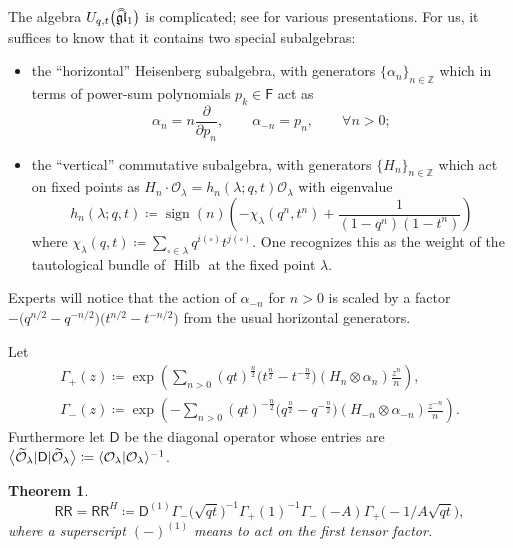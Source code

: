 \documentclass[pdftex]{sigma}%
\numberwithin{equation}{section}
\newtheorem{Theorem}{Theorem}[section]
\renewcommand{\hat}[1]{\widehat{#1}}
\newcommand{\hhat}[1]{\hat{\vphantom{\rule{1pt}{5.5pt}}\smash{\hat{#1}}}}
\renewcommand{\tilde}[1]{\widetilde{#1}}
\newcommand{\lie}[1]{\mathfrak{#1}}
\newcommand{\bZ}{\mathbb{Z}}
\newcommand{\cO}{\mathcal{O}}
\newcommand{\sD}{\mathsf{D}}
\newcommand{\sF}{\mathsf{F}}
\newcommand{\sRR}{\mathsf{RR}}
\newcommand{\di}{\partial}
\DeclareMathOperator{\sign}{sign}
\DeclareMathOperator{\Hilb}{Hilb}
\DeclarePairedDelimiter{\inner}{\langle}{\rangle}
\begin{document}
\begin{MyParagraph}\label{sec:quantum-toroidal-gl1-details}
The algebra $U_{q,t}\big(\hhat{\lie{gl}}_1\big)$ is complicated; see
\cite{Schiffmann2012} for various presentations. For us, it suffices
to know that it contains two special subalgebras:
\begin{itemize}\itemsep=0pt
\item the ``horizontal'' Heisenberg subalgebra, with generators
 $\{\alpha_n\}_{n \in \bZ}$ which in terms of power-sum polynomials
 $p_k \in \sF$ act as
 \[ \alpha_n = n\frac{\di}{\di p_n}, \qquad \alpha_{-n} = p_n, \qquad \forall n > 0; \]
\item the ``vertical'' commutative subalgebra, with generators
 $\{H_n\}_{n \in \bZ}$ which act on fixed points as $H_n \cdot \cO_\lambda
 = h_n(\lambda;q,t) \cO_\lambda$ with eigenvalue
 \begin{equation} \label{eq:tautological-weight-hilb}
 h_n(\lambda;q,t) \coloneqq \sign(n) \left(-\chi_\lambda(q^n, t^n) + \frac{1}{(1 - q^n)(1 - t^n)}\right)
 \end{equation}
 where
 $\chi_{\lambda}(q,t) \coloneqq \sum_{\square \in \lambda} q^{i(\square)} t^{j(\square)}$.
 One recognizes this as the weight of the tautological bundle of
 $\Hilb$ at the fixed point $\lambda$.
\end{itemize}
Experts will notice that the action of $\alpha_{-n}$ for $n > 0$ is
scaled by a factor $-\big(q^{n/2}-q^{-n/2}\big)\big(t^{n/2}-t^{-n/2}\big)$ from the
usual horizontal generators.
\end{MyParagraph}

\begin{MyParagraph}
Let
\begin{gather}
 \Gamma_+(z) \coloneqq \exp\left(\sum_{n>0} (qt)^{\frac{n}{2}} \big(t^{\frac{n}{2}} - t^{-\frac{n}{2}}\big) (H_n \otimes \alpha_n) \frac{z^n}{n}\right),\nonumber \\
 \Gamma_-(z) \coloneqq \exp\left(-\sum_{n>0} (qt)^{-\frac{n}{2}} \big(q^{\frac{n}{2}} - q^{-\frac{n}{2}}\big) (H_{-n} \otimes \alpha_{-n}) \frac{z^{-n}}{n}\right).\label{eq:gamma-vertex-operators}
 \end{gather}
Furthermore let $\sD$ be the diagonal operator whose entries are
$\big\langle \tilde\cO_\lambda | \sD | \tilde\cO_\lambda\big\rangle \coloneqq
\inner{\cO_\lambda | \cO_\lambda}^{-1}$.

\begin{Theorem} \label{thm:instanton-four-point-adjoint-as-horizontal-operator}
 \begin{equation} \label{eq:instanton-four-point-horizontal-operator-formula}
 \sRR = \sRR^H \coloneqq \sD^{(1)} \Gamma_-\big(\sqrt{qt}\big)^{-1} \Gamma_+ (1 )^{-1} \Gamma_- (-A ) \Gamma_+\big({-}1/A\sqrt{qt}\big),
 \end{equation}
 where a superscript $(-)^{(1)}$ means to act on the first tensor
 factor.
\end{Theorem}
\end{MyParagraph}
\end{document}

